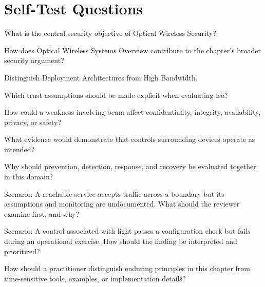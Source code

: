 \documentclass[11pt,letterpaper]{article}
\begin{document}
\section*{Self-Test Questions}
\begin{CornellRecallList}
\item What is the central security objective of Optical Wireless Security?
\item How does Optical Wireless Systems Overview contribute to the chapter's broader security argument?
\item Distinguish Deployment Architectures from High Bandwidth.
\item Which trust assumptions should be made explicit when evaluating fso?
\item How could a weakness involving beam affect confidentiality, integrity, availability, privacy, or safety?
\item What evidence would demonstrate that controls surrounding devices operate as intended?
\item Why should prevention, detection, response, and recovery be evaluated together in this domain?
\item Scenario: A reachable service accepts traffic across a boundary but its assumptions and monitoring are undocumented. What should the reviewer examine first, and why?
\item Scenario: A control associated with light passes a configuration check but fails during an operational exercise. How should the finding be interpreted and prioritized?
\item How should a practitioner distinguish enduring principles in this chapter from time-sensitive tools, examples, or implementation details?
\end{CornellRecallList}
\end{document}
